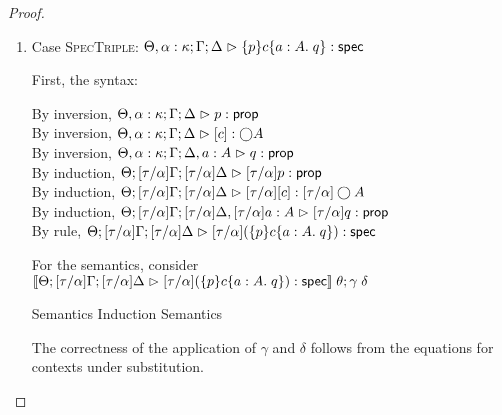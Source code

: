 \begin{proof}
\begin{enumerate}
\item Case \textsc{SpecTriple}: $\judgeS[\Theta, \alpha:\kappa; \Gamma; \Delta]{\spec{p}{c}{a:A}{q}}$
  
  First, the syntax:
  \begin{tabbedproof}
    \oo By inversion, $\judgeA[\Theta, \alpha:\kappa; \Gamma; \Delta]{p}{\assert}$ \\
    \oo By inversion, $\judgeA[\Theta, \alpha:\kappa; \Gamma; \Delta]{\comp{c}}{\monad{A}}$ \\
    \oo By inversion, $\judgeA[\Theta, \alpha:\kappa; \Gamma; \Delta, a:A]{q}{\assert}$ \\
    \oo By induction, $\judgeA[\Theta; {[\tau/\alpha]}\Gamma; {[\tau/\alpha]}\Delta]{{[\tau/\alpha]}p}{\assert}$ \\
    \oo By induction, $\judgeA[\Theta; {[\tau/\alpha]}\Gamma; {[\tau/\alpha]}\Delta]{{[\tau/\alpha]}\comp{c}}{{[\tau/\alpha]}\monad{A}}$ \\
    \oo By induction, $\judgeA[\Theta; {[\tau/\alpha]}\Gamma; {[\tau/\alpha]}\Delta, {[\tau/\alpha]}a:A]{{[\tau/\alpha]}q}{\assert}$ \\
    \oo By rule, $\judgeS[\Theta; {[\tau/\alpha]}\Gamma; {[\tau/\alpha]}\Delta]{{[\tau/\alpha]}(\spec{p}{c}{a:A}{q})}$
  \end{tabbedproof}

  For the semantics, consider $\interp{\judgeS[\Theta; {[\tau/\alpha]}\Gamma; {[\tau/\alpha]}\Delta]{{[\tau/\alpha]}(\spec{p}{c}{a:A}{q})}}\;\theta;\gamma\;\delta$
  \begin{eqnproof}
          {Semantics}
          {Induction}
          {Semantics}
  \end{eqnproof}
  The correctness of the application of $\gamma$ and $\delta$ follows from the equations for
  contexts under substitution. 


\end{enumerate}
\end{proof}
